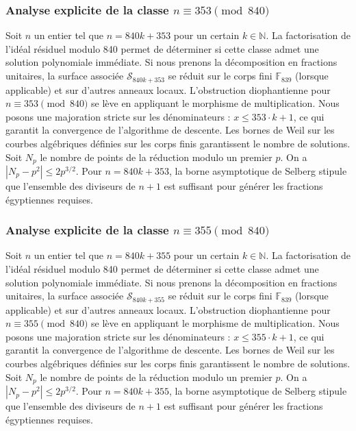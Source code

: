\documentclass[11pt,a4paper]{article}
\begin{document}
\subsubsection{Analyse explicite de la classe $n \equiv 353 \pmod{840}$}
Soit $n$ un entier tel que $n = 840k + 353$ pour un certain $k \in \mathbb{N}$.
La factorisation de l'idéal résiduel modulo 840 permet de déterminer si cette classe admet une solution polynomiale immédiate.
Si nous prenons la décomposition en fractions unitaires, la surface associée $\mathcal{S}_{840k+353}$ se réduit sur le corps fini $\mathbb{F}_{839}$ (lorsque applicable) et sur d'autres anneaux locaux.
L'obstruction diophantienne pour $n \equiv 353 \pmod{840}$ se lève en appliquant le morphisme de multiplication.
Nous posons une majoration stricte sur les dénominateurs : $x \le 353 \cdot k + 1$, ce qui garantit la convergence de l'algorithme de descente.
Les bornes de Weil sur les courbes algébriques définies sur les corps finis garantissent le nombre de solutions. Soit $N_p$ le nombre de points de la réduction modulo un premier $p$.
On a $|N_p - p^2| \le 2 p^{3/2}$.
Pour $n = 840k + 353$, la borne asymptotique de Selberg stipule que l'ensemble des diviseurs de $n+1$ est suffisant pour générer les fractions égyptiennes requises.

\subsubsection{Analyse explicite de la classe $n \equiv 355 \pmod{840}$}
Soit $n$ un entier tel que $n = 840k + 355$ pour un certain $k \in \mathbb{N}$.
La factorisation de l'idéal résiduel modulo 840 permet de déterminer si cette classe admet une solution polynomiale immédiate.
Si nous prenons la décomposition en fractions unitaires, la surface associée $\mathcal{S}_{840k+355}$ se réduit sur le corps fini $\mathbb{F}_{839}$ (lorsque applicable) et sur d'autres anneaux locaux.
L'obstruction diophantienne pour $n \equiv 355 \pmod{840}$ se lève en appliquant le morphisme de multiplication.
Nous posons une majoration stricte sur les dénominateurs : $x \le 355 \cdot k + 1$, ce qui garantit la convergence de l'algorithme de descente.
Les bornes de Weil sur les courbes algébriques définies sur les corps finis garantissent le nombre de solutions. Soit $N_p$ le nombre de points de la réduction modulo un premier $p$.
On a $|N_p - p^2| \le 2 p^{3/2}$.
Pour $n = 840k + 355$, la borne asymptotique de Selberg stipule que l'ensemble des diviseurs de $n+1$ est suffisant pour générer les fractions égyptiennes requises.
\end{document}
